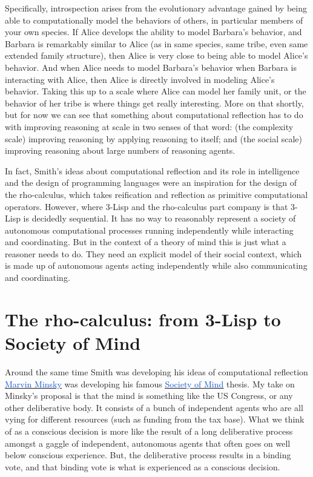 \documentclass[runningheads]{llncs}
\begin{document}
\vspace{1\baselineskip}
Specifically, introspection arises from the evolutionary advantage gained by being able to computationally model the behaviors of others, in particular members of your own species. If Alice develops the ability to model Barbara’s behavior, and Barbara is remarkably similar to Alice (as in same species, same tribe, even same extended family structure), then Alice is very close to being able to model Alice’s behavior. And when Alice needs to model Barbara’s behavior when Barbara is interacting with Alice, then Alice is directly involved in modeling Alice’s behavior. Taking this up to a scale where Alice can model her family unit, or the behavior of her tribe is where things get really interesting. More on that shortly, but for now we can see that something about computational reflection has to do with improving reasoning at scale in two senses of that word: (the complexity scale) improving reasoning by applying reasoning to itself; and (the social scale) improving reasoning about large numbers of reasoning agents.

\vspace{1\baselineskip}
In fact, Smith’s ideas about computational reflection and its role in intelligence and the design of programming languages were an inspiration for the design of the rho-calculus, which takes reification and reflection as primitive computational operators. However, where 3-Lisp and the rho-calculus part company is that 3-Lisp is decidedly sequential. It has no way to reasonably represent a society of autonomous computational processes running independently while interacting and coordinating. But in the context of a theory of mind this is just what a reasoner needs to do. They need an explicit model of their social context, which is made up of autonomous agents acting independently while also communicating and coordinating.

\vspace{1\baselineskip}
\section{The rho-calculus: from 3-Lisp to Society of Mind}

\vspace{1\baselineskip}
Around the same time Smith was developing his ideas of computational reflection \href{https://en.wikipedia.org/wiki/Marvin_Minsky}{\uline{\textcolor[HTML]{1155CC}{Marvin Minsky}}} was developing his famous \href{https://en.wikipedia.org/wiki/Society_of_Mind}{\uline{\textcolor[HTML]{1155CC}{Society of Mind}}} thesis. My take on Minsky’s proposal is that the mind is something like the US Congress, or any other deliberative body. It consists of a bunch of independent agents who are all vying for different resources (such as funding from the tax base). What we think of as a conscious decision is more like the result of a long deliberative process amongst a gaggle of independent, autonomous agents that often goes on well below conscious experience. But, the deliberative process results in a binding vote, and that binding vote is what is experienced as a conscious decision.
\end{document}

